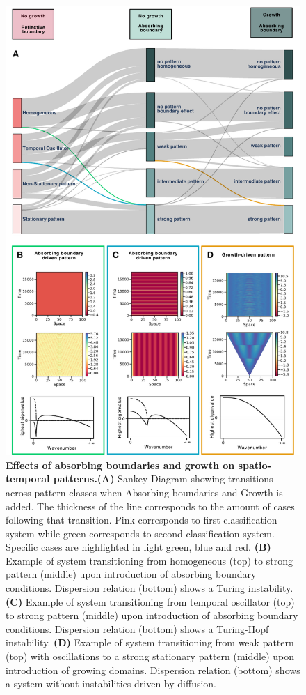 \documentclass[10pt,letterpaper]{article}
\begin{document}
\begin{figure}[H]
    \includegraphics[width=1\textwidth]{figures/boundaries_growth} %
    \caption{\textbf{Effects of absorbing boundaries and growth on spatio-temporal patterns.}\textbf{(A)} Sankey Diagram showing transitions across pattern classes when Absorbing boundaries and Growth is added. The thickness of the line corresponds to the amount of cases following that transition. Pink corresponds to first classification system while green corresponds to second classification system. Specific cases are highlighted in light green, blue and red. \textbf{(B)} Example of system transitioning from homogeneous (top) to strong pattern (middle) upon introduction of absorbing boundary conditions. Dispersion relation (bottom) shows a Turing instability. \textbf{(C)} Example of system transitioning from temporal oscillator (top) to strong pattern (middle) upon introduction of absorbing boundary conditions. Dispersion relation (bottom) shows a Turing-Hopf instability. \textbf{(D)} Example of system transitioning from weak pattern (top) with oscillations to a strong stationary pattern (middle) upon introduction of growing domains. Dispersion relation (bottom) shows a system without instabilities driven by diffusion.  }
    \label{fig:boundariesgrowth} %
\end{figure}
\end{document}
